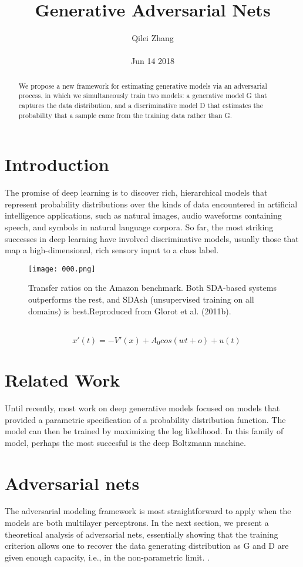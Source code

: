 \documentclass[30pt,twocolumn,letterpaper]{article}
\author{Qilei Zhang\\\\
Jun 14 2018}
\title{Generative Adversarial Nets}
\begin{document}
\maketitle
\begin{abstract}
  We propose a new framework for estimating generative models via an adversarial process, in which we simultaneously train two models: a generative model G that captures the data distribution, and a discriminative model D that estimates the probability that a sample came from the training data rather than G.
\end{abstract}
\section{Introduction}
The promise of deep learning is to discover rich, hierarchical models that represent probability distributions over the kinds of data encountered in artificial intelligence applications, such as natural images, audio waveforms containing speech, and symbols in natural language corpora. So far, the most striking successes in deep learning have involved discriminative models, usually those that map a high-dimensional, rich sensory input to a class label\cite{Barat2016String}. \\
\begin{figure}[htbp]
\small
\centering
\texttt{[image: 000.png]}
\caption{Transfer ratios on the Amazon benchmark. Both SDA-based systems outperforms the rest, and SDAsh (unsupervised training on all domains) is best.Reproduced from Glorot et al. (2011b).}
\label{fig:lable}
\end{figure}\\
\begin{equation}
\quad x'(t)=-V'(x)+A_0cos(wt+o)+u(t)
\end{equation}
\section{Related Work}
Until recently, most work on deep generative models focused on models that provided a parametric specification of a probability distribution function\cite{Eiber2013Attaining}. The model can then be trained by maximizing the log likelihood. In this family of model, perhaps the most succesful is the deep Boltzmann machine\cite{Pustejovsky1998The}.\\
\section{Adversarial nets}
The adversarial modeling framework is most straightforward to apply when the models are both multilayer perceptrons\cite{Wittrock1989Generative}. In the next section, we present a theoretical analysis of adversarial nets, essentially showing that the training criterion allows one to recover the data generating distribution as G and D are given enough capacity, i.e., in the non-parametric limit\cite{Yi2010Effective}.
.
{\small


}
\end{document}
